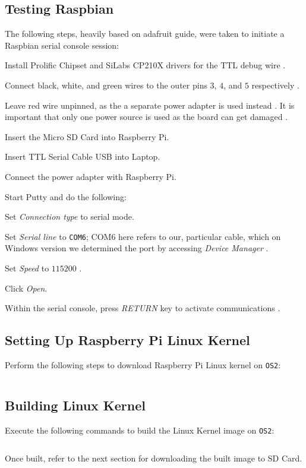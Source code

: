 \documentclass[onecolumn, draftclsnofoot, 10pt, compsoc]{IEEEtran}
\begin{document}
\subsection{Testing Raspbian}
The following steps, heavily based on adafruit guide, were taken to initiate a Raspbian serial console session:
\begin{description}
\item Install Prolific Chipset and SiLabs CP210X drivers for the TTL debug wire \cite{adafruit2}.
\item Connect black, white, and green wires to the outer pins $3$, $4$, and $5$ respectively \cite{adafruit1}.
\item Leave red wire unpinned, as the a separate power adapter is used instead \cite{adafruit1}. It is important that only one power source is used as the board can get damaged \cite{adafruit1}.
\item Insert the Micro SD Card into Raspberry Pi.
\item Insert TTL Serial Cable USB into Laptop.
\item Connect the power adapter with Raspberry Pi.
\item Start Putty and do the following:
\begin{description}
\item Set \textit{Connection type} to serial mode.
\item Set \textit{Serial line} to \texttt{COM6}; {COM6} here refers to our, particular cable, which on Windows version we determined the port by accessing \textit{Device Manager} \cite{adafruit1}.
\item Set \textit{Speed} to $115200$ \cite{adafruit1}.
\item Click \textit{Open}.
\end{description}
\item Within the serial console, press \textit{RETURN} key to activate communications \cite{adafruit1}.
\end{description}


\subsection{Setting Up Raspberry Pi Linux Kernel}
Perform the following steps to download Raspberry Pi Linux kernel on \texttt{OS2}:
\inputminted[breaklines]{bash}{cs1.sh}


\subsection{Building Linux Kernel}
Execute the following commands to build the Linux Kernel image on \texttt{OS2}:
\inputminted[breaklines]{bash}{cs3.sh}
Once built, refer to the next section for downloading the built image to SD Card.
\end{document}
